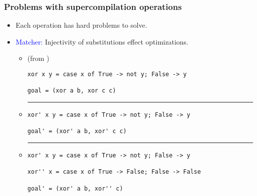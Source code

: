 \documentclass{beamer}
\begin{document}
\begin{frame}[fragile]
    \frametitle{Problems with supercompilation operations}

    \begin{itemize}
        \item[]
            Each operation has hard problems to solve.

        \item[]
            \textcolor{blue}{Matcher:} Injectivity of substitutions effect
            optimizations.
            \begin{itemize}[<+(1)->]
                \item[]
                    (from \citet{callbyneed-sc})

                    \begin{verbatim}
xor x y = case x of True -> not y; False -> y

goal = (xor a b, xor c c)
                    \end{verbatim}

                \item[]
                    \centering\noindent\rule{4cm}{0.4pt}
                    \bigskip
                    \begin{verbatim}
xor' x y = case x of True -> not y; False -> y

goal' = (xor' a b, xor' c c)
                    \end{verbatim}

                \item[]
                    \centering\noindent\rule{4cm}{0.4pt}
                    \bigskip
                    \begin{verbatim}
xor' x y = case x of True -> not y; False -> y

xor'' x = case x of True -> False; False -> False

goal' = (xor' a b, xor'' c)
                    \end{verbatim}
            \end{itemize}
    \end{itemize}
\end{frame}
\end{document}

